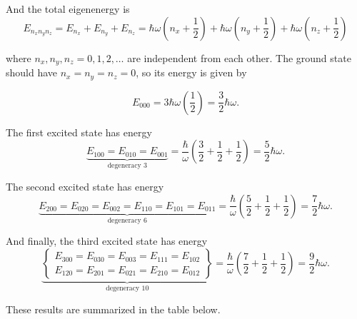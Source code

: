 \documentclass{article}
\numberwithin{equation}{section}
\begin{document}
And the total eigenenergy is
\begin{equation}
    E_{n_x n_y n_z} = E_{n_x} + E_{n_y} + E_{n_z} = \hbar \omega \left( n_x + \frac{1}{2} \right) + \hbar \omega \left( n_y + \frac{1}{2} \right) + \hbar \omega \left( n_z + \frac{1}{2} \right) \label{eq:3dQHO:eigenenergy}
\end{equation}

where $n_x, n_y, n_z = 0, 1, 2, \dots$ are independent from each other. The ground state should have $n_x = n_y = n_z = 0$, so its energy is given by

\begin{equation*}
    E_{000} = 3 \hbar \omega \left( \frac{1}{2} \right) = \frac{3}{2} \hbar \omega.
\end{equation*}

The first excited state has energy
\begin{equation*}
    \underbrace{E_{100} = E_{010} = E_{001}}_{\text{degeneracy 3}} = \frac{\hbar}{\omega} \left( \frac{3}{2} + \frac{1}{2} + \frac{1}{2} \right) = \frac{5}{2} \hbar \omega.
\end{equation*}

The second excited state has energy
\begin{equation*}
    \underbrace{E_{200} = E_{020} = E_{002} = E_{110} = E_{101} = E_{011}}_{\text{degeneracy 6}} = \frac{\hbar}{\omega} \left( \frac{5}{2} + \frac{1}{2} + \frac{1}{2} \right) = \frac{7}{2} \hbar \omega.
\end{equation*}

And finally, the third excited state has energy
\begin{equation*}
    \underbrace{\left\{ \begin{array}{l} E_{300} = E_{030} = E_{003} = E_{111} = E_{102} \\[0.4em] E_{120} = E_{201} = E_{021} = E_{210} = E_{012} \end{array} \right\}}_{\text{degeneracy 10}} = \frac{\hbar}{\omega} \left( \frac{7}{2} + \frac{1}{2} + \frac{1}{2} \right) = \frac{9}{2} \hbar \omega.
\end{equation*}

These results are summarized in the table below.
\end{document}
